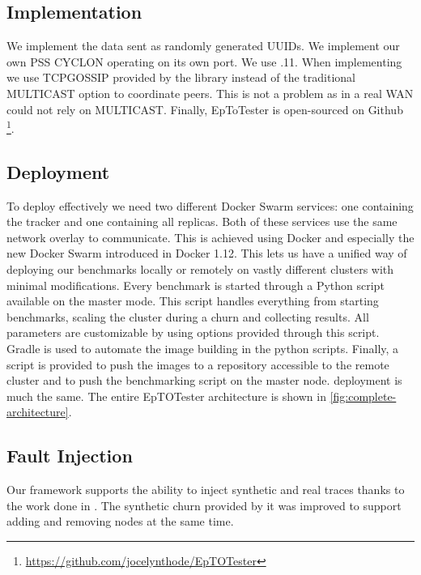 \subsection{Implementation}
We implement the data sent as randomly generated UUIDs. We implement our own PSS CYCLON operating on its own port.  We use .11. When implementing \jgroups we use TCPGOSSIP provided by the \jgroups library instead of the traditional MULTICAST option to coordinate peers. This is not a problem as in a real WAN \jgroups could not rely on MULTICAST. Finally, EpToTester  is open-sourced on Github \footnote{\href{https://github.com/jocelynthode/EpTOTester}{https://github.com/jocelynthode/EpTOTester}}.
\subsection{Deployment}
% 	
To deploy \epto effectively we need two different Docker Swarm services: one containing the tracker and one containing all \epto replicas. Both of these services use the same network overlay to communicate. This is achieved using Docker and especially the new Docker Swarm introduced in Docker 1.12. This lets us have a unified way of deploying our benchmarks locally or remotely on vastly different clusters with minimal modifications. Every benchmark is started through a Python script available on the master mode. This script handles everything from starting benchmarks, scaling the cluster during a churn and collecting results. All \epto parameters are customizable by using options provided through this script.
Gradle  is used to automate the image building in the python scripts. Finally, a script is provided to push the images to a repository accessible to the remote cluster and to push the benchmarking script on the master node. \jgroups deployment is much the same. The entire EpTOTester architecture is shown in \autoref{fig:complete-architecture}. 
\subsection{Fault Injection}
Our framework supports the ability to inject synthetic and real traces thanks to the work done in \autocite{vaucher2016erasure}. The synthetic churn provided by it was improved to support adding and removing nodes at the same time.
